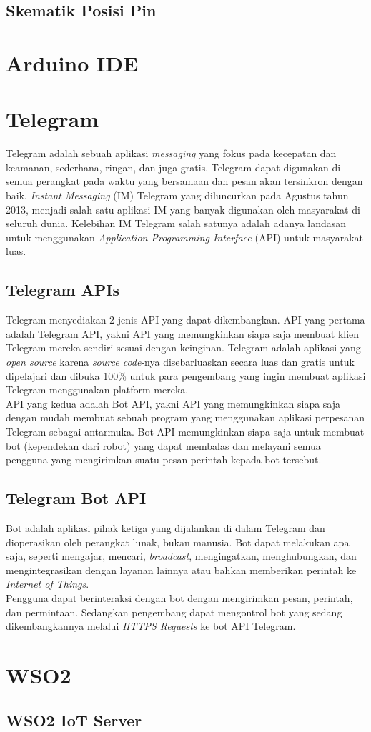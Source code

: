 \subsection{Skematik Posisi Pin}


\section{Arduino IDE}






\section{Telegram}
\tab Telegram adalah sebuah aplikasi \textit{messaging} yang fokus pada kecepatan dan keamanan, sederhana, ringan, dan juga gratis. Telegram dapat digunakan di semua perangkat pada waktu yang bersamaan dan pesan akan tersinkron dengan baik. \textit{Instant Messaging} (IM) Telegram yang diluncurkan pada Agustus tahun 2013, menjadi salah satu aplikasi IM yang banyak digunakan oleh masyarakat di seluruh dunia. Kelebihan
IM Telegram salah satunya adalah adanya landasan untuk
menggunakan \textit{Application Programming Interface} (API) untuk
masyarakat luas.

\subsection{Telegram APIs}
\tab Telegram menyediakan 2 jenis API yang dapat dikembangkan. API yang pertama adalah Telegram API, yakni API yang memungkinkan siapa saja membuat klien Telegram mereka sendiri sesuai dengan keinginan. Telegram adalah aplikasi yang \textit{open source} karena \textit{source code}-nya disebarluaskan secara luas dan gratis untuk dipelajari dan dibuka 100\% untuk para pengembang yang ingin membuat aplikasi Telegram menggunakan platform mereka. \\
\tab API yang kedua adalah Bot API, yakni API yang memungkinkan siapa saja dengan mudah membuat sebuah program yang menggunakan aplikasi perpesanan Telegram sebagai antarmuka. Bot API memungkinkan siapa saja untuk membuat bot (kependekan dari robot) yang dapat membalas dan melayani semua pengguna yang mengirimkan suatu pesan perintah kepada bot tersebut.
\subsection{Telegram Bot API}
\tab Bot adalah aplikasi pihak ketiga yang dijalankan di dalam Telegram dan dioperasikan oleh perangkat lunak, bukan manusia. Bot dapat melakukan apa saja, seperti mengajar, mencari, \textit{broadcast}, mengingatkan, menghubungkan, dan mengintegrasikan dengan layanan lainnya atau bahkan memberikan perintah ke \textit{Internet of Things}.\\
\tab Pengguna dapat berinteraksi dengan bot dengan mengirimkan pesan, perintah, dan permintaan. Sedangkan pengembang dapat mengontrol bot yang sedang dikembangkannya melalui \textit{HTTPS Requests} ke bot API Telegram. 

\section{WSO2}
\subsection{WSO2 IoT Server}

\cleardoublepage